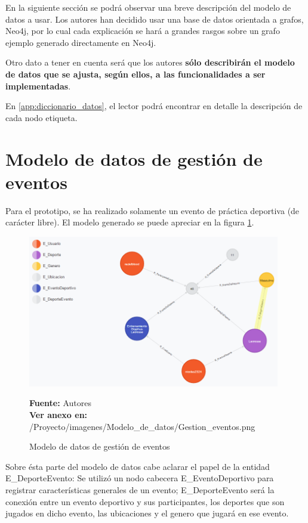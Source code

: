 En la siguiente sección se podrá observar una breve descripción del modelo de datos a usar. Los autores han decidido usar una base de datos orientada a grafos, Neo4j, por lo cual cada explicación se hará a grandes rasgos sobre un grafo ejemplo generado directamente en Neo4j.

Otro dato a tener en cuenta será que los autores \textbf{sólo describirán el modelo de datos que se ajusta, según ellos, a las funcionalidades a ser implementadas}.

En \ref{app:diccionario_datos}, el lector podrá encontrar en detalle la descripción de cada nodo etiqueta.

\section{Modelo de datos de gestión de eventos}

Para el prototipo, se ha realizado solamente un evento de práctica deportiva (de carácter libre). El modelo generado se puede apreciar en la figura \ref{fig:modelo_datos_gestion_eventos}.

\begin{figure}[!htb]
  \begin{center}
    \includegraphics[width=11cm]{./imagenes/Modelo_de_datos/Gestion_eventos.png}
    \caption{Modelo de datos de gestión de eventos}
    \label{fig:modelo_datos_gestion_eventos}
    \textbf{Fuente:}  Autores \\
    \textbf{Ver anexo en:} /Proyecto/imagenes/Modelo\_de\_datos/Gestion\_eventos.png
  \end{center}
\end{figure}

Sobre ésta parte del modelo de datos cabe aclarar el papel de la entidad E\_DeporteEvento: Se utilizó un nodo cabecera E\_EventoDeportivo para registrar características generales de un evento; E\_DeporteEvento será la conexión entre un evento deportivo y sus participantes, los deportes que son jugados en dicho evento, las ubicaciones y el genero que jugará en ese evento.

